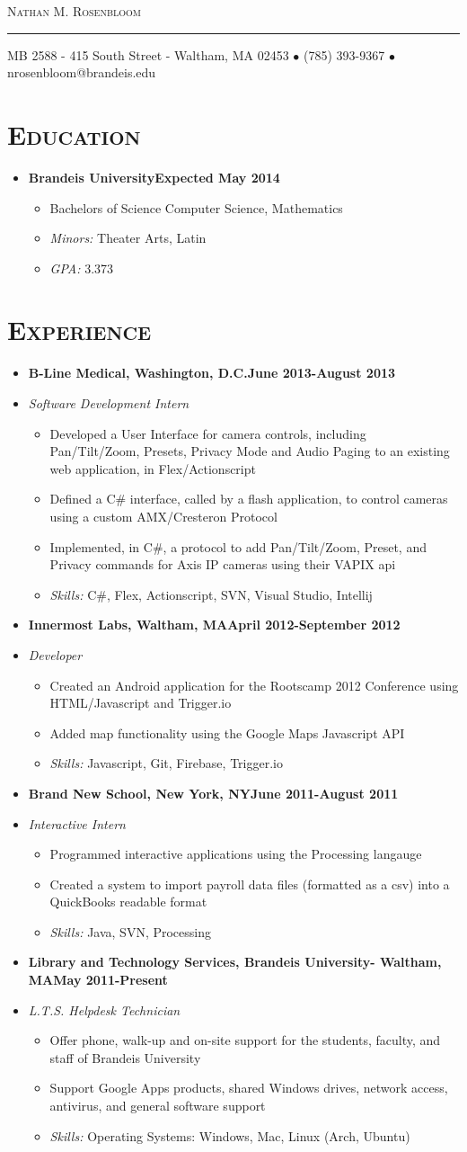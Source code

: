 \documentclass[10pt, oneside]{article}
\makeatletter
\newcommand{\lr}[2]{#1\hfill#2}
\newcommand{\name}{Nathan M. Rosenbloom}
\newcommand{\addr}{MB 2588 - 415 South Street - Waltham, MA 02453}
\newcommand{\phone}{(785) 393-9367}
\newcommand{\email}{nrosenbloom@brandeis.edu}
\newcommand{\resname}[4]{
  \begin{center}
    \selectfont\LARGE\scshape #1
    \normalfont
    \footnotesize
    \itshape
    \rule{\textwidth}{1pt}
    #2 $\bullet$ #3 $\bullet$ #4
    \normalfont
  \end{center}
}
\newcommand{\reseducation}[5]{
  \begin{ressection}{Education}
  \item[] \lr{\bfseries \selectfont #1\normalfont} {Expected #2}
    \vspace{-8pt}
    \begin{itemize} \itemsep-2pt
      \item[] #4
      \item[] \textsl{Minors: }#5
      \item[] \textsl{GPA: }#3
    \end{itemize}
  \end{ressection}
}
\newcommand{\skills}[1]{
\item[] \textsl{Skills:} #1
}
\newenvironment{ressection}[1]{
  \section{\normalsize \scshape \selectfont #1 \normalfont}
  \vspace{-4pt}
  \begin{itemize} \itemsep-2pt
}{
  \end{itemize}
  \vspace{-20pt}
}
\newenvironment{resitem}[4]{
\item[] \lr{\bfseries \selectfont #1\normalfont, #2} {#3}
\item[] \textsl{#4}
  \vspace{-4pt}
  \begin{itemize} \itemsep-2pt
}{
  \end{itemize}
}
\makeatother
\begin{document}
\resname{\name}{\addr}{\phone}{\email}
\setcounter{secnumdepth}{-1} %
\reseducation{Brandeis University}{May 2014}{3.373}{Bachelors of Science Computer Science, Mathematics}{Theater Arts, Latin}
\begin{ressection}{Experience}
  \begin{resitem}{B-Line Medical}{Washington, D.C.}{June 2013-August 2013}{Software Development Intern}
  \item Developed a User Interface for camera controls, including Pan/Tilt/Zoom, Presets, Privacy Mode and Audio Paging to an existing web application, in Flex/Actionscript
  \item Defined a C\# interface, called by a flash application, to control cameras using a custom AMX/Cresteron Protocol
  \item Implemented, in C\#, a protocol to add Pan/Tilt/Zoom, Preset, and Privacy commands for Axis IP cameras using their VAPIX api
    \skills{C\#, Flex, Actionscript, SVN, Visual Studio, Intellij}
  \end{resitem}
  \begin{resitem}{Innermost Labs}{Waltham, MA}{April 2012-September 2012}{Developer}
  \item Created an Android application for the Rootscamp 2012 Conference using HTML/Javascript and Trigger.io
  \item Added map functionality using the Google Maps Javascript API
    \skills{Javascript, Git, Firebase, Trigger.io}
  \end{resitem}
  \begin{resitem}{Brand New School}{New York, NY}{June 2011-August 2011}{Interactive Intern}
  \item Programmed interactive applications using the Processing langauge
  \item Created a system to import payroll data files (formatted as a csv) into a QuickBooks readable format
    \skills{Java, SVN, Processing}
  \end{resitem}
  \begin{resitem}{Library and Technology Services}{Brandeis University- Waltham, MA}{May 2011-Present}{L.T.S. Helpdesk Technician} 
  \item Offer phone, walk-up and on-site support for the students, faculty, and staff of Brandeis University
  \item Support Google Apps products, shared Windows drives, network access, antivirus, and general software support 
    \skills{Operating Systems: Windows, Mac, Linux (Arch, Ubuntu)}
  \end{resitem}
\end{ressection}
\end{document}
